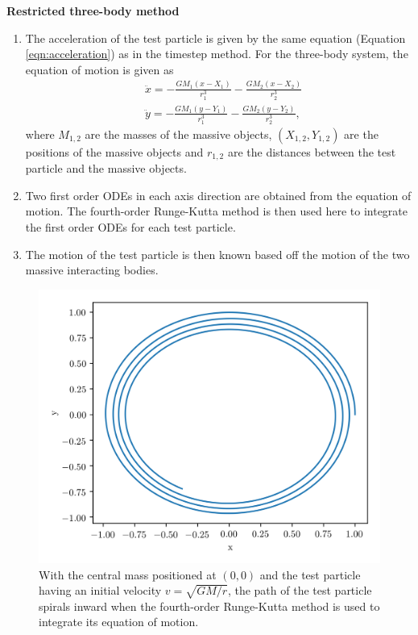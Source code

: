 \documentclass[twoside,twocolumn]{article}
\begin{document}
    \textbf{Restricted three-body method}
    \begin{enumerate}
        \item The acceleration of the test particle is given by the same equation (Equation \ref{eqn:acceleration}) as in the timestep method. For the three-body system, the equation of motion is given as \cite{three_body}
        \begin{equation}
            \begin{split}
                &\ddot{x} = - \frac{GM_1(x - X_1)}{r_1^3} - \frac{GM_2(x - X_2)}{r_2^3} \\
                &\ddot{y} = - \frac{GM_1(y - Y_1)}{r_1^3} - \frac{GM_2(y - Y_2)}{r_2^3},
            \end{split}
        \end{equation}
        where $M_{1,2}$ are the masses of the massive objects, $(X_{1, 2}, Y_{1, 2})$ are the positions of the massive objects and $r_{1, 2}$ are the distances between the test particle and the massive objects. 
        \item Two first order ODEs in each axis direction are obtained from the equation of motion. The fourth-order Runge-Kutta method is then used here to integrate the first order ODEs for each test particle.
        \item The motion of the test particle is then known based off the motion of the two massive interacting bodies.
    \end{enumerate}
    
    \begin{figure}
        \centering
        \includegraphics[width=\linewidth]{images/RK45.png}
        \caption{With the central mass positioned at $(0, 0)$ and the test particle having an initial velocity $v = \sqrt{GM/r}$, the path of the test particle spirals inward when the fourth-order Runge-Kutta method is used to integrate its equation of motion.}
        \label{figure:RK45}
        
    \end{figure}
\end{document}
